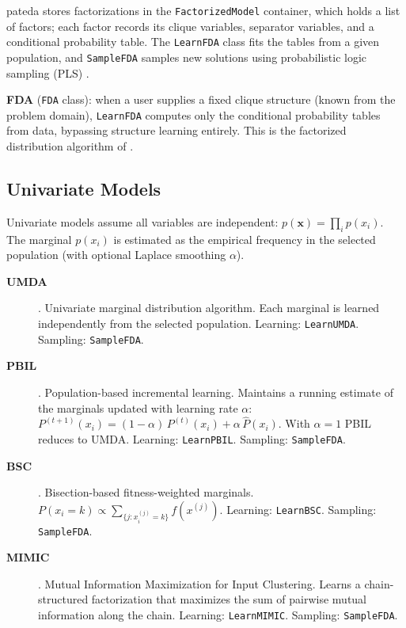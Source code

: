 \documentclass[a4paper,11pt]{article}
\begin{document}
pateda stores factorizations in the \texttt{FactorizedModel} container, which
holds a list of factors; each factor records its clique variables, separator
variables, and a conditional probability table.  The \texttt{LearnFDA} class
fits the tables from a given population, and \texttt{SampleFDA} samples new
solutions using probabilistic logic sampling (PLS) \citep{Muhlenbein_and_Paas:1996}.

\textbf{FDA} (\texttt{FDA} class): when a user supplies a fixed clique
structure (known from the problem domain), \texttt{LearnFDA} computes only
the conditional probability tables from data, bypassing structure learning
entirely.  This is the factorized distribution algorithm of
\citet{Muhlenbein_et_al:1999}.

\subsection{Univariate Models}
\label{sec:univariate}

Univariate models assume all variables are independent: $p(\mathbf{x}) =
\prod_i p(x_i)$.  The marginal $p(x_i)$ is estimated as the empirical
frequency in the selected population (with optional Laplace smoothing
$\alpha$).

\begin{description}
  \item[\textbf{UMDA}] \citep{Muhlenbein_and_Paas:1996}.
    Univariate marginal distribution algorithm.  Each marginal is learned
    independently from the selected population.
    Learning: \texttt{LearnUMDA}. Sampling: \texttt{SampleFDA}.

  \item[\textbf{PBIL}] \citep{Baluja:1994}.
    Population-based incremental learning.  Maintains a running estimate
    of the marginals updated with learning rate $\alpha$:
    $P^{(t+1)}(x_i) = (1 - \alpha)\,P^{(t)}(x_i) + \alpha\,\hat{P}(x_i)$.
    With $\alpha = 1$ PBIL reduces to UMDA.
    Learning: \texttt{LearnPBIL}. Sampling: \texttt{SampleFDA}.

  \item[\textbf{BSC}] \citep{Inza_et_al:2000}.
    Bisection-based fitness-weighted marginals.
    $P(x_i = k) \propto \sum_{\{j: x_i^{(j)} = k\}} f(x^{(j)})$.
    Learning: \texttt{LearnBSC}. Sampling: \texttt{SampleFDA}.

  \item[\textbf{MIMIC}] \citep{DeBonet_et_al:1996}.
    Mutual Information Maximization for Input Clustering.
    Learns a chain-structured factorization that maximizes the sum of
    pairwise mutual information along the chain.
    Learning: \texttt{LearnMIMIC}. Sampling: \texttt{SampleFDA}.
\end{description}
\end{document}
